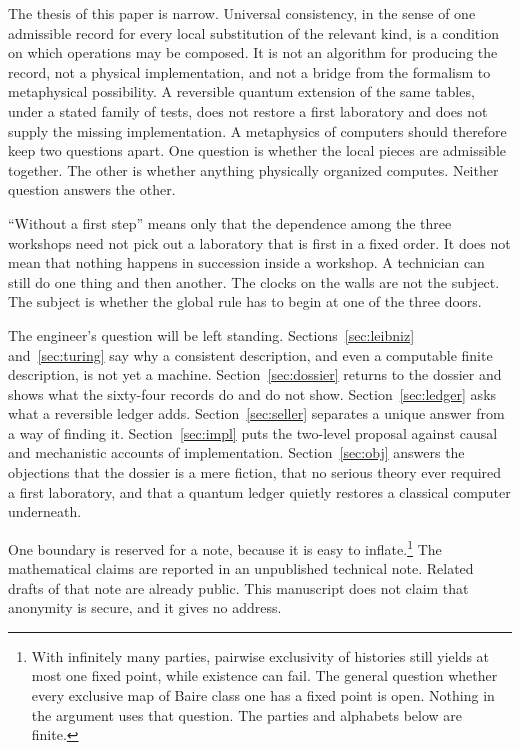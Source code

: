 \documentclass[11pt]{article}
\begin{document}
The thesis of this paper is narrow. Universal consistency, in the sense of one admissible record for every local substitution of the relevant kind, is a condition on which operations may be composed. It is not an algorithm for producing the record, not a physical implementation, and not a bridge from the formalism to metaphysical possibility. A reversible quantum extension of the same tables, under a stated family of tests, does not restore a first laboratory and does not supply the missing implementation. A metaphysics of computers should therefore keep two questions apart. One question is whether the local pieces are admissible together. The other is whether anything physically organized computes. Neither question answers the other.

``Without a first step'' means only that the dependence among the three workshops need not pick out a laboratory that is first in a fixed order. It does not mean that nothing happens in succession inside a workshop. A technician can still do one thing and then another. The clocks on the walls are not the subject. The subject is whether the global rule has to begin at one of the three doors.

The engineer’s question will be left standing. Sections~\ref{sec:leibniz} and~\ref{sec:turing} say why a consistent description, and even a computable finite description, is not yet a machine. Section~\ref{sec:dossier} returns to the dossier and shows what the sixty-four records do and do not show. Section~\ref{sec:ledger} asks what a reversible ledger adds. Section~\ref{sec:seller} separates a unique answer from a way of finding it. Section~\ref{sec:impl} puts the two-level proposal against causal and mechanistic accounts of implementation. Section~\ref{sec:obj} answers the objections that the dossier is a mere fiction, that no serious theory ever required a first laboratory, and that a quantum ledger quietly restores a classical computer underneath.

One boundary is reserved for a note, because it is easy to inflate.\footnote{With infinitely many parties, pairwise exclusivity of histories still yields at most one fixed point, while existence can fail. The general question whether every exclusive map of Baire class one has a fixed point is open. Nothing in the argument uses that question. The parties and alphabets below are finite.} The mathematical claims are reported in an unpublished technical note. Related drafts of that note are already public. This manuscript does not claim that anonymity is secure, and it gives no address.
\end{document}
